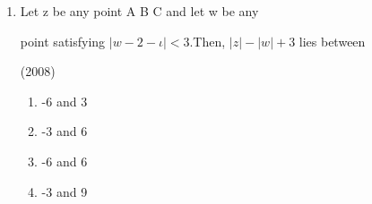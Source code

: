 \documentclass[journal]{IEEEtran}
\theoremstyle{remark}
\begin{document}
\begin{enumerate}
\begin{enumerate}
\item  Let z be any point A B C and let w be any

point satisfying $|w-2-\iota|<3$.Then, $|z|-|w|+3$ lies between
   
   \hfill (2008) \\
 \begin{multicols}{2}
  \begin{enumerate}
    \item -6 and 3
    \item -3 and 6 
    \item -6 and 6
    \item -3 and 9
  \end{enumerate}
 \end{multicols}

 
 
\end{enumerate}

\end{enumerate}
\end{document}

